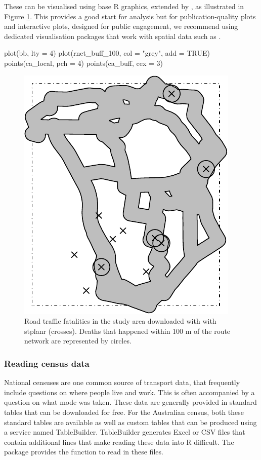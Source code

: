 These can be visualised using base R graphics, extended by ,
as illustrated in Figure \ref{fig:fats}. This provides a good start for
analysis but for publication-quality plots and interactive plots,
designed for public engagement, we recommend using dedicated
visualisation packages that work with spatial data such as
.

\begin{Schunk}
\begin{Sinput}
plot(bb, lty = 4)
plot(rnet_buff_100, col = "grey", add = TRUE)
points(ca_local, pch = 4)
points(ca_buff, cex = 3)
\end{Sinput}
\begin{figure}

{\centering \includegraphics[width=0.5\linewidth]{fats-1}

}

\caption[Road traffic fatalities in the study area downloaded with with  (crosses)]{Road traffic fatalities in the study area downloaded with with stplanr (crosses). Deaths that happened within 100 m of the route network are represented by circles.}\label{fig:fats}
\end{figure}
\end{Schunk}

\subsubsection{Reading census data} \label{reading-census-data}

National censuses are one common source of transport data, that frequently include questions on where people live and work.
This is often accompanied by a question on what mode was taken.
These data are generally provided in standard tables that can be downloaded for free.
For the Australian census, both these standard tables are available as well as custom tables that can be produced using a service named TableBuilder.
TableBuilder generates Excel or CSV files that contain additional lines that make reading these data into R difficult.
The  package provides the  function to read in these files.

